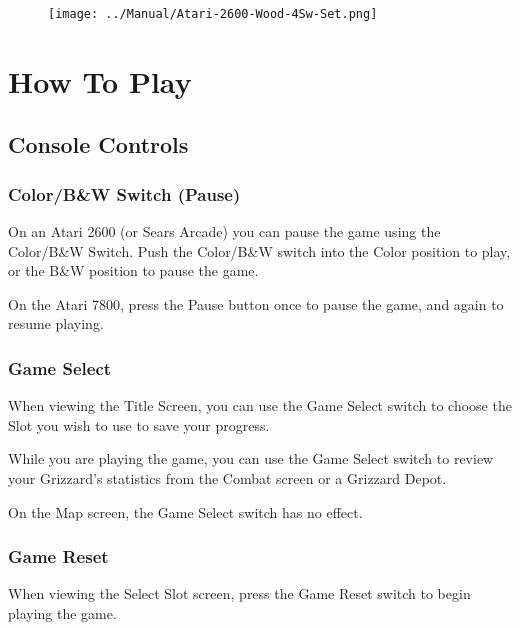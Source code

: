 \documentclass[10pt,twocolumn,openany,article]{memoir}
\begin{document}
\begin{figure}[h]
  \begin{center}
    \texttt{[image: ../Manual/Atari-2600-Wood-4Sw-Set.png]}
  \end{center}
\end{figure}


\vfill

\chapter{How To Play}

\section{Console Controls}

\ifdefined\TVSECAM
\else

\subsection{Color/B\&W Switch (Pause)}

On an  Atari 2600  (or Sears Arcade)  you can pause  the game  using the
Color/B\&W Switch. Push the Color/B\&W switch into the Color position to
play, or the B\&W position to pause the game.

On the Atari  7800, press the Pause  button once to pause  the game, and
again to resume playing.

\fi

\subsection{Game Select}

When viewing  the Title Screen,  you can use  the Game Select  switch to
choose the Slot you wish to use to save your progress.

While you are  playing the game, you  can use the Game  Select switch to
review   your  Grizzard's   statistics   from  the   Combat  screen   or
a Grizzard Depot.

On the Map screen, the Game Select switch has no effect.

\subsection{Game Reset}

When viewing  the Select  Slot screen,  press the  Game Reset  switch to
begin playing the game.
\end{document}
